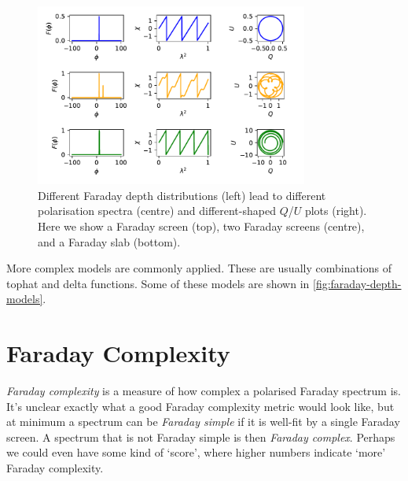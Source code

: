 \documentclass[a4paper]{article}
\newcommand{\defn}[1]{\emph{#1}}
\begin{document}
    \begin{figure}
        \centering
        \includegraphics[width=0.8\textwidth]{faraday-depth.pdf}
        \caption{Different Faraday depth distributions (left) lead to different polarisation spectra (centre) and different-shaped $Q$/$U$ plots (right). Here we show a Faraday screen (top), two Faraday screens (centre), and a Faraday slab (bottom). \label{fig:faraday-depth-models}}
    \end{figure}

    More complex models are commonly applied. These are usually combinations of tophat and delta functions. Some of these models are shown in \autoref{fig:faraday-depth-models}.

    \section{Faraday Complexity}

    \defn{Faraday complexity} is a measure of how complex a polarised Faraday spectrum is. It's unclear exactly what a good Faraday complexity metric would look like, but at minimum a spectrum can be \defn{Faraday simple} if it is well-fit by a single Faraday screen. A spectrum that is not Faraday simple is then \defn{Faraday complex}. Perhaps we could even have some kind of `score', where higher numbers indicate `more' Faraday complexity.
\end{document}
